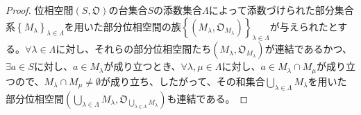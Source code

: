 \documentclass[dvipdfmx]{jsarticle}
\begin{document}
\begin{proof}
位相空間$\left( S,\mathfrak{O} \right)$の台集合$S$の添数集合$\varLambda$によって添数づけられた部分集合系$\left\{ M_{\lambda} \right\}_{\lambda \in \varLambda}$を用いた部分位相空間の族$\left\{ \left( M_{\lambda},\mathfrak{O}_{M_{\lambda}} \right) \right\}_{\lambda \in \varLambda}$が与えられたとする。$\forall\lambda \in \varLambda$に対し、それらの部分位相空間たち$\left( M_{\lambda},\mathfrak{O}_{M_{\lambda}} \right)$が連結であるかつ、$\exists a \in S$に対し、$a \in M_{\lambda}$が成り立つとき、$\forall\lambda,\mu \in \varLambda$に対し、$a \in M_{\lambda} \cap M_{\mu}$が成り立つので、$M_{\lambda} \cap M_{\mu} \neq \emptyset$が成り立ち、したがって、その和集合$\bigcup_{\lambda \in \varLambda} M_{\lambda}$を用いた部分位相空間$\left( \bigcup_{\lambda \in \varLambda} M_{\lambda},\mathfrak{O}_{\bigcup_{\lambda \in \varLambda} M_{\lambda}} \right)$も連結である。
\end{proof}
\end{document}
